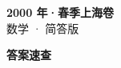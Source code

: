 \documentclass[zihao=-4, a4paper]{ctexart}
\begin{document}
\begin{center}
  {\Large\bfseries 2000 年·春季上海卷}\\[4pt]
  {\large 数学 · 简答版}
\end{center}
\medskip
{}

\clearpage
{}
\begin{center}{\Large\bfseries 答案速查}\end{center}
\medskip

\end{document}
